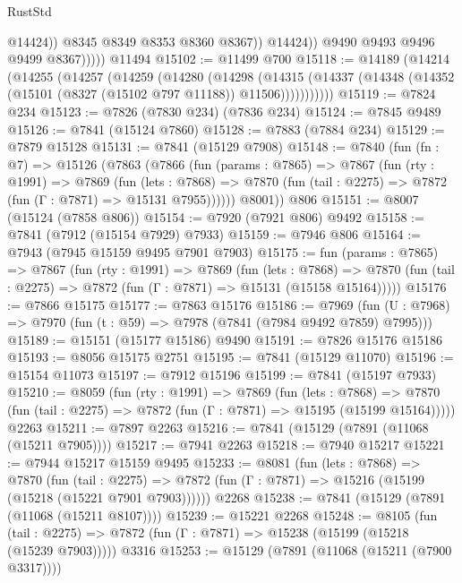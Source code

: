 \begin{lexlean}{RustStd}
\begin{coremodule}
{\begin{coremodule}
{{{{{{{{{{{{{{{{{{{{{{{{{{{{{{{{{{{{{{{{{{{{{{{{{{{{{{                          @14424))
                      @8345
                      @8349
                      @8353
                      @8360
                      @8367))
                  @14424))
              @9490
              @9493
              @9496
              @9499
              @8367)))))
    @11494
@15102 := @11499 @700
@15118 := @14189
    (@14214
      (@14255
        (@14257
          (@14259
            (@14280
              (@14298
                (@14315
                  (@14337 (@14348 (@14352 (@15101 (@8327 (@15102 @797 @11188)) @11506)))))))))))
@15119 := @7824 @234
@15123 := @7826 (@7830 @234) (@7836 @234)
@15124 := @7845 @9489
@15126 := @7841 (@15124 @7860)
@15128 := @7883 (@7884 @234)
@15129 := @7879 @15128
@15131 := @7841 (@15129 @7908)
@15148 := @7840
    (fun (fn : @7) =>
    @15126
      (@7863
        (@7866
          (fun (params : @7865) =>
          @7867
            (fun (rty : @1991) =>
            @7869
              (fun (lets : @7868) =>
              @7870 (fun (tail : @2275) => @7872 (fun (Γ : @7871) => @15131 @7955))))))
        @8001))
    @806
@15151 := @8007 (@15124 (@7858 @806))
@15154 := @7920 (@7921 @806) @9492
@15158 := @7841 (@7912 (@15154 @7929) @7933)
@15159 := @7946 @806
@15164 := @7943 (@7945 @15159 @9495 @7901 @7903)
@15175 := fun (params : @7865) =>
  @7867
    (fun (rty : @1991) =>
    @7869
      (fun (lets : @7868) =>
      @7870 (fun (tail : @2275) => @7872 (fun (Γ : @7871) => @15131 (@15158 @15164)))))
@15176 := @7866 @15175
@15177 := @7863 @15176
@15186 := @7969
    (fun (U : @7968) => @7970 (fun (t : @59) => @7978 (@7841 (@7984 @9492 @7859) @7995)))
@15189 := @15151 (@15177 @15186) @9490
@15191 := @7826 @15176 @15186
@15193 := @8056 @15175 @2751
@15195 := @7841 (@15129 @11070)
@15196 := @15154 @11073
@15197 := @7912 @15196
@15199 := @7841 (@15197 @7933)
@15210 := @8059
    (fun (rty : @1991) =>
    @7869
      (fun (lets : @7868) =>
      @7870 (fun (tail : @2275) => @7872 (fun (Γ : @7871) => @15195 (@15199 @15164)))))
    @2263
@15211 := @7897 @2263
@15216 := @7841 (@15129 (@7891 (@11068 (@15211 @7905))))
@15217 := @7941 @2263
@15218 := @7940 @15217
@15221 := @7944 @15217 @15159 @9495
@15233 := @8081
    (fun (lets : @7868) =>
    @7870
      (fun (tail : @2275) =>
      @7872 (fun (Γ : @7871) => @15216 (@15199 (@15218 (@15221 @7901 @7903))))))
    @2268
@15238 := @7841 (@15129 (@7891 (@11068 (@15211 @8107))))
@15239 := @15221 @2268
@15248 := @8105
    (fun (tail : @2275) => @7872 (fun (Γ : @7871) => @15238 (@15199 (@15218 (@15239 @7903)))))
    @3316
@15253 := @15129 (@7891 (@11068 (@15211 (@7900 @3317))))
}}}}}}}}}}}}}}}}}}}}}}}}}}}}}}}}}}}}}}}}}}}}}}}}}}}}}}
\end{coremodule}}
\end{coremodule}
\end{lexlean}
